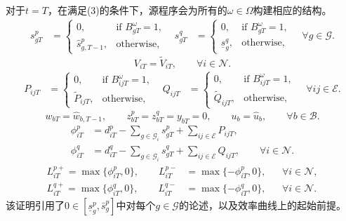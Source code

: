 \documentclass[10pt]{article}
\begin{document}
对于$t=T$，在满足(3)的条件下，源程序会为所有的$\omega\in\Omega$构建相应的结构。
\begin{equation}
\begin{aligned}
s_{gT}^p&=\begin{cases}0,&\text{if }B_{gT}^\omega=1,\\ \hat s_{g,T-1}^p,&\text{otherwise},\end{cases}
& s_{gT}^q&=\begin{cases}0,&\text{if }B_{gT}^\omega=1,\\ \underline s_g^q,&\text{otherwise},\end{cases}
\quad\forall g\in\mathcal G.
\end{aligned}\tag{4a}
\end{equation}
\begin{equation}
V_{iT}=\widetilde V_{iT},\qquad\forall i\in\mathcal N.\tag{4b}
\end{equation}
\begin{equation}
\begin{aligned}
P_{ijT}&=\begin{cases}0,&\text{if }B_{ijT}^\omega=1,\\\widetilde P_{ijT},&\text{otherwise},\end{cases}
&Q_{ijT}&=\begin{cases}0,&\text{if }B_{ijT}^\omega=1,\\\widetilde Q_{ijT},&\text{otherwise},\end{cases}
\quad\forall ij\in\mathcal E.
\end{aligned}\tag{4c}
\end{equation}
\begin{equation}
w_{bT}=\hat w_{b,T-1},\qquad z_{bT}^p=z_{bT}^q=y_{bT}=0,\qquad u_b=\hat u_b,\qquad\forall b\in\mathcal B.\tag{4d}
\end{equation}
\begin{equation}
\begin{aligned}
\phi_{iT}^p&=d_{iT}^p-\sum_{g\in\mathcal G_i}s_{gT}^p+\sum_{ij\in\mathcal E}P_{ijT},\\
\phi_{iT}^q&=d_{iT}^q-\sum_{g\in\mathcal G_i}s_{gT}^q+\sum_{ij\in\mathcal E}Q_{ijT},\qquad\forall i\in\mathcal N.
\end{aligned}\tag{4e}
\end{equation}
\begin{align}
L_{iT}^{p+}=\max\{\phi_{iT}^p,0\},\qquad L_{iT}^{p-}&=\max\{-\phi_{iT}^p,0\},&&\forall i\in\mathcal N,\tag{4f}\\
L_{iT}^{q+}=\max\{\phi_{iT}^q,0\},\qquad L_{iT}^{q-}&=\max\{-\phi_{iT}^q,0\},&&\forall i\in\mathcal N.\tag{4g}
\end{align}
该证明引用了$0\in[\underline s_g^p,\bar s_g^p]$中对每个$g\in\mathcal G$的论述，以及效率曲线上的起始前提。
\end{document}
